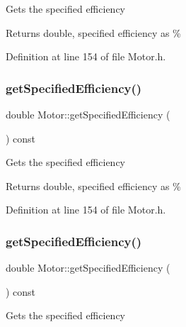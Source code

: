 Gets the specified efficiency

\begin{DoxyReturn}{Returns}
double, specified efficiency as \% 
\end{DoxyReturn}


Definition at line 154 of file Motor.\+h.

\mbox{\label{class_motor_aca202d3c2061bd8c19e1819331033e36}} 
\subsubsection{\texorpdfstring{get\+Specified\+Efficiency()}{getSpecifiedEfficiency()}\hspace{0.1cm}{\footnotesize\ttfamily [2/3]}}
{\footnotesize\ttfamily double Motor\+::get\+Specified\+Efficiency (\begin{DoxyParamCaption}{ }\end{DoxyParamCaption}) const\hspace{0.3cm}{\ttfamily [inline]}}

Gets the specified efficiency

\begin{DoxyReturn}{Returns}
double, specified efficiency as \% 
\end{DoxyReturn}


Definition at line 154 of file Motor.\+h.

\mbox{\label{class_motor_aca202d3c2061bd8c19e1819331033e36}} 
\subsubsection{\texorpdfstring{get\+Specified\+Efficiency()}{getSpecifiedEfficiency()}\hspace{0.1cm}{\footnotesize\ttfamily [3/3]}}
{\footnotesize\ttfamily double Motor\+::get\+Specified\+Efficiency (\begin{DoxyParamCaption}{ }\end{DoxyParamCaption}) const\hspace{0.3cm}{\ttfamily [inline]}}

Gets the specified efficiency

